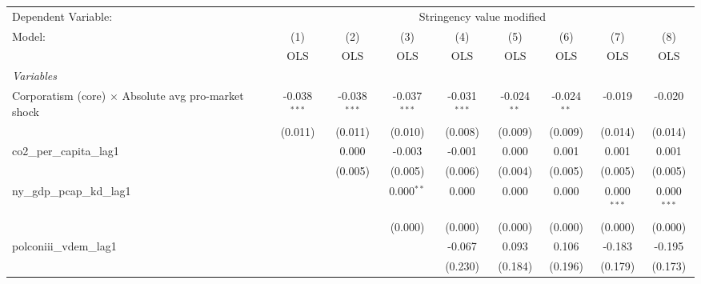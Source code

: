 
\begingroup
\centering
\begin{tabular}{lcccccccc}
   \toprule
   Dependent Variable: & \multicolumn{8}{c}{Stringency value modified}\\
   Model:                                                     & (1)            & (2)            & (3)            & (4)            & (5)           & (6)           & (7)           & (8)\\  
                                                              &  OLS           & OLS            & OLS            & OLS            & OLS           & OLS           & OLS           & OLS\\  
   \midrule
   \emph{Variables}\\
   Corporatism (core) $\times$ Absolute avg pro-market shock  & -0.038$^{***}$ & -0.038$^{***}$ & -0.037$^{***}$ & -0.031$^{***}$ & -0.024$^{**}$ & -0.024$^{**}$ & -0.019        & -0.020\\   
                                                              & (0.011)        & (0.011)        & (0.010)        & (0.008)        & (0.009)       & (0.009)       & (0.014)       & (0.014)\\   
   co2\_per\_capita\_lag1                                     &                & 0.000          & -0.003         & -0.001         & 0.000         & 0.001         & 0.001         & 0.001\\   
                                                              &                & (0.005)        & (0.005)        & (0.006)        & (0.004)       & (0.005)       & (0.005)       & (0.005)\\   
   ny\_gdp\_pcap\_kd\_lag1                                    &                &                & 0.000$^{**}$   & 0.000          & 0.000         & 0.000         & 0.000$^{***}$ & 0.000$^{***}$\\   
                                                              &                &                & (0.000)        & (0.000)        & (0.000)       & (0.000)       & (0.000)       & (0.000)\\   
   polconiii\_vdem\_lag1                                      &                &                &                & -0.067         & 0.093         & 0.106         & -0.183        & -0.195\\   
                                                              &                &                &                & (0.230)        & (0.184)       & (0.196)       & (0.179)       & (0.173)\\   

\end{tabular}
